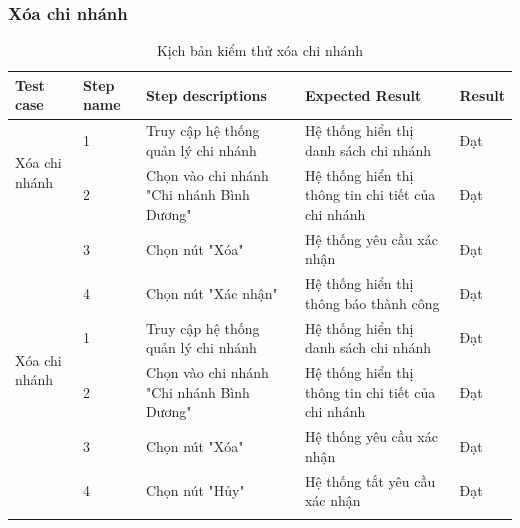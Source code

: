 \subsubsection{Xóa chi nhánh}
{
    \setlength\extrarowheight{6pt}
    \begin{longtable}{| p{2.5cm}| p{1cm}| p{5.5cm}| p{4.5cm} | p{1.5cm} |}
        \hline
        \textbf{Test case}                    & \textbf{Step name} & \textbf{Step descriptions}                & \textbf{Expected Result}                           & \textbf{Result} \\
        \hline
        \multirow[t]{2}{2.5cm}{Xóa chi nhánh} & 1                  & Truy cập hệ thống quản lý chi nhánh       & Hệ thống hiển thị danh sách chi nhánh              & Đạt             \\
        \cline{2-5}
                                              & 2                  & Chọn vào chi nhánh "Chi nhánh Bình Dương" & Hệ thống hiển thị thông tin chi tiết của chi nhánh & Đạt             \\
        \cline{2-5}
                                              & 3                  & Chọn nút "Xóa"                            & Hệ thống yêu cầu xác nhận                          & Đạt             \\
        \cline{2-5}
                                              & 4                  & Chọn nút "Xác nhận"                       & Hệ thống hiển thị thông báo thành công             & Đạt             \\
        \hline
        \multirow[t]{2}{2.5cm}{Xóa chi nhánh} & 1                  & Truy cập hệ thống quản lý chi nhánh       & Hệ thống hiển thị danh sách chi nhánh              & Đạt             \\
        \cline{2-5}
                                              & 2                  & Chọn vào chi nhánh "Chi nhánh Bình Dương" & Hệ thống hiển thị thông tin chi tiết của chi nhánh & Đạt             \\
        \cline{2-5}
                                              & 3                  & Chọn nút "Xóa"                            & Hệ thống yêu cầu xác nhận                          & Đạt             \\
        \cline{2-5}
                                              & 4                  & Chọn nút "Hủy"                            & Hệ thống tắt yêu cầu xác nhận                      & Đạt             \\
        \hline
        \caption{Kịch bản kiểm thử xóa chi nhánh}
    \end{longtable}
}


